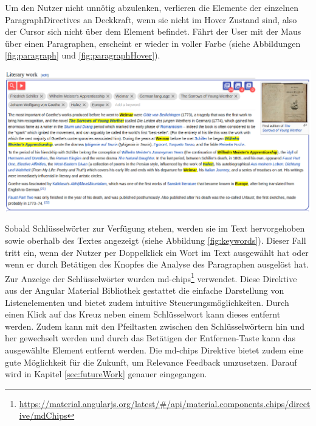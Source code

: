  Um den Nutzer nicht unnötig abzulenken, verlieren die Elemente der einzelnen ParagraphDirectives an Deckkraft, wenn sie nicht im Hover Zustand sind, also der Cursor sich nicht über dem Element befindet. Fährt der User mit der Maus über einen Paragraphen, erscheint er wieder in voller Farbe (siehe Abbildungen \ref{fig:paragraph} und \ref{fig:paragraphHover}).

 \begin{minipage}{\linewidth}
	\centering
	\vspace*{0.5cm}
	\includegraphics[width=\linewidth]{Bilder/app-screenshots/keywords_v1.png}
	\label{fig:keywords}
	\vspace*{0.5cm}
 \end{minipage}

 Sobald Schlüsselwörter zur Verfügung stehen, werden sie im Text hervorgehoben sowie oberhalb des Textes angezeigt (siehe Abbildung \ref{fig:keywords}). Dieser Fall tritt ein, wenn der Nutzer per Doppelklick ein Wort im Text ausgewählt hat oder wenn er durch Betätigen des Knopfes die Analyse des Paragraphen ausgelöst hat. Zur Anzeige der Schlüsselwörter wurden md-chips\footnote{\url{https://material.angularjs.org/latest/\#/api/material.components.chips/directive/mdChips}} verwendet. Diese Direktive aus der Angular Material Bibliothek gestattet die einfache Darstellung von Listenelementen und bietet zudem intuitive Steuerungsmöglichkeiten. Durch einen Klick auf das Kreuz neben einem Schlüsselwort kann dieses entfernt werden. Zudem kann mit den Pfeiltasten zwischen den Schlüsselwörtern hin und her gewechselt werden und durch das Betätigen der Entfernen-Taste kann das ausgewählte Element entfernt werden. Die md-chips Direktive bietet zudem eine gute Möglichkeit für die Zukunft, um Relevance Feedback umzusetzen. Darauf wird in Kapitel \ref{sec:futureWork} genauer eingegangen.

